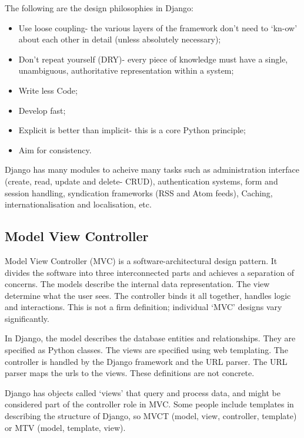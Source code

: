\documentclass[a4paper, openany]{memoir}
\begin{document}
    The following are the design philosophies in Django:
    \begin{itemize}
        \item Use loose coupling- the various layers of the framework don't need to `kn-ow' about each other in detail (unless absolutely necessary);
        \item Don't repeat yourself (DRY)- every piece of knowledge must have a single, unambiguous, authoritative representation within a system;
        \item Write less Code;
        \item Develop fast;
        \item Explicit is better than implicit- this is a core Python principle;
        \item Aim for consistency.
    \end{itemize}
    Django has many modules to acheive many tasks such as administration interface (create, read, update and delete- CRUD), authentication systems, form and session handling, syndication frameworks (RSS and Atom feeds), Caching, internationalisation and localisation, etc.

    \subsection{Model View Controller}
    Model View Controller (MVC) is a software-architectural design pattern. It divides the software into three interconnected parts and achieves a separation of concerns. The models describe the internal data representation. The view determine what the user sees. The controller binds it all together, handles logic and interactions. This is not a firm definition; individual `MVC' designs vary significantly.

    \noindent In Django, the model describes the database entities and relationships. They are specified as Python classes. The views are specified using web templating. The controller is handled by the Django framework and the URL parser. The URL parser maps the urls to the views. These definitions are not concrete. 

    \noindent Django has objects called `views' that query and process data, and might be considered part of the controller role in MVC. Some people include templates in describing the structure of Django, so MVCT (model, view, controller, template) or MTV (model, template, view).
\end{document}

